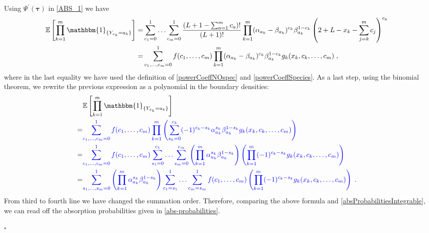 \documentclass[10pt]{article}
\numberwithin{equation}{section}
\numberwithin{equation}{subsection}
\newcommand{\co}{\;,}
\newcommand{\dt}{\;.}
\newcommand{\fra}[1]{\textcolor[rgb]{0,0,1}{#1}}
\begin{document}
Using $\Psi^{'}(\bm{\tau})$ in \eqref{ABS_1} we have 
\begin{align}
	\mathbb{E}\left[\prod_{k=1}^{m}\mathbbm{1}_{\{Y_{x_{k}}=a_{k}\}}\right]=&\sum_{c_{1}=0}^{1}\ldots\sum_{c_{m}=0}^{1}\frac{(L+1-\sum_{a=1}^{m}c_{a})!}{(L+1)!}\prod_{k=1}^{m}(\alpha_{a_{k}}-\beta_{a_{k}})^{c_{k}}\beta_{a_{k}}^{1-c_{k}}\left(2+L-x_{k}-\sum_{j=k}^{m}c_{j}\right)^{c_{k}}\nonumber\\
	=&\sum_{c_{1},\ldots,c_{m}=0}^{1}
	f(c_{1},\ldots,c_{m})\prod_{k=1}^{m}(\alpha_{a_{k}}-\beta_{a_{k}})^{c_{k}}\beta_{a_{k}}^{1-c_{k}}g_{k}(x_{k},c_{k},\ldots,c_{m})\co
\end{align}
where in the last equality we have used the definition of \eqref{powerCoeffNOspec} and \eqref{powerCoeffSpecies}.
As a last step, using the binomial theorem, we rewrite the previous expression as a polynomial in the boundary densities: 
\begin{align}
	&\mathbb{E}\left[\prod_{k=1}^{m}\mathbbm{1}_{\{Y_{x_{k}}=a_{k}\}}\right]\nonumber\\=&
	\fra{\sum_{c_{1},\ldots,c_{m}=0}^{1}
	f(c_{1},\ldots,c_{m})\prod_{k=1}^{m}\left(\sum_{s_{k}=0}^{c_{k}}(-1)^{c_{k}-s_{k}}\alpha_{a_{k}}^{s_{k}}\beta_{a_{k}}^{1-s_{k}}g_{k}(x_{k},c_{k},\ldots,c_{m})\right)}\nonumber\\
	=&\fra{\sum_{c_{1},\ldots,c_{m}=0}^{1}
	f(c_{1},\ldots,c_{m})\sum_{s_{1}=0}^{c_{1}}\ldots\sum_{s_{m}=0}^{c_{m}}\left(\prod_{k=1}^{m}\alpha_{a_{k}}^{s_{k}}\beta_{a_{k}}^{1-s_{k}}\right)\left(\prod_{k=1}^{m}(-1)^{c_{k}-s_{k}}g_{k}(x_{k},c_{k},\ldots,c_{m})\right)}\nonumber\\
	=&\fra{\sum_{s_{1},\ldots,s_{m}=0}^{1}\left(\prod_{k=1}^{m}\alpha_{a_{k}}^{s_{k}}\beta_{a_{k}}^{1-s_{k}}\right)\sum_{c_{1}=s_{1}}^{1}\ldots\sum_{c_{m}=s_{m}}^{1}f(c_{1},\ldots,c_{m})\left(\prod_{k=1}^{m}(-1)^{c_{k}-s_{k}}g_{k}(x_{k},c_{k},\ldots,c_{m})\right)\dt}
\end{align}
From third to fourth line we have changed the summation order. Therefore, comparing the above formula and \eqref{absProbabilitiesIntegrable}, we can read off the absorption probabilities given in \eqref{abs-probabilities}.
\begin{flushright}
	$\square$
\end{flushright}
\end{document}
